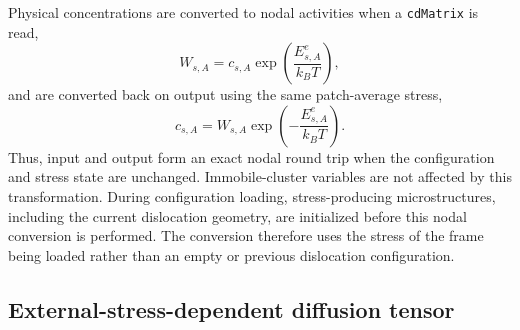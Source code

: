 \documentclass[10pt]{article}
\begin{document}
Physical concentrations are converted to nodal activities when a
\texttt{cdMatrix} is read,
\begin{equation}
    W_{s,A}
    =
    c_{s,A}
    \exp\left(\frac{E_{s,A}^e}{k_BT}\right),
\end{equation}
and are converted back on output using the same patch-average stress,
\begin{equation}
    c_{s,A}
    =
    W_{s,A}
    \exp\left(-\frac{E_{s,A}^e}{k_BT}\right).
    \label{eq:nodal_output_conversion}
\end{equation}
Thus, input and output form an exact nodal round trip when the configuration
and stress state are unchanged.  Immobile-cluster variables are not affected
by this transformation.  During configuration loading, stress-producing
microstructures, including the current dislocation geometry, are initialized
before this nodal conversion is performed.  The conversion therefore uses the
stress of the frame being loaded rather than an empty or previous dislocation
configuration.

\subsection{External-stress-dependent diffusion tensor}
\end{document}

